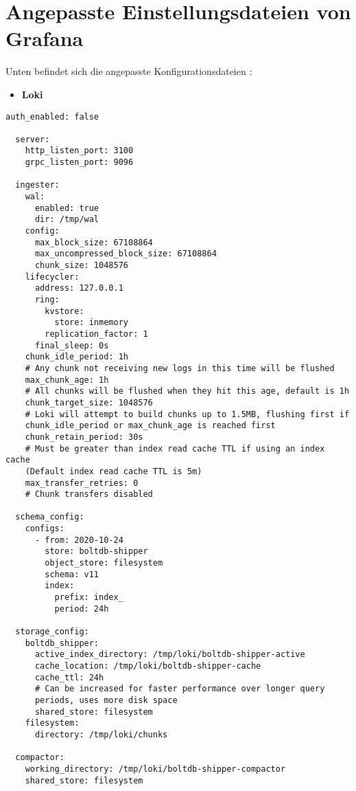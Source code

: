 \section{Angepasste Einstellungsdateien von Grafana}\label{appendix:AngepasstGrafana}

Unten befindet sich die angepasste Konfigurationsdateien \citep{Polinowski_PGL}:

\begin{itemize}[noitemsep]
    \item \textbf{Loki}
\end{itemize}

{
\begin{Verbatim}[frame=single]
  auth_enabled: false

  server:
    http_listen_port: 3100
    grpc_listen_port: 9096
  
  ingester:
    wal:
      enabled: true
      dir: /tmp/wal
    config:
      max_block_size: 67108864
      max_uncompressed_block_size: 67108864
      chunk_size: 1048576
    lifecycler:
      address: 127.0.0.1
      ring:
        kvstore:
          store: inmemory
        replication_factor: 1
      final_sleep: 0s
    chunk_idle_period: 1h       
    # Any chunk not receiving new logs in this time will be flushed
    max_chunk_age: 1h           
    # All chunks will be flushed when they hit this age, default is 1h
    chunk_target_size: 1048576  
    # Loki will attempt to build chunks up to 1.5MB, flushing first if
    chunk_idle_period or max_chunk_age is reached first
    chunk_retain_period: 30s    
    # Must be greater than index read cache TTL if using an index cache
    (Default index read cache TTL is 5m)
    max_transfer_retries: 0    
    # Chunk transfers disabled
  
  schema_config:
    configs:
      - from: 2020-10-24
        store: boltdb-shipper
        object_store: filesystem
        schema: v11
        index:
          prefix: index_
          period: 24h
  
  storage_config:
    boltdb_shipper:
      active_index_directory: /tmp/loki/boltdb-shipper-active
      cache_location: /tmp/loki/boltdb-shipper-cache
      cache_ttl: 24h         
      # Can be increased for faster performance over longer query 
      periods, uses more disk space
      shared_store: filesystem
    filesystem:
      directory: /tmp/loki/chunks
  
  compactor:
    working_directory: /tmp/loki/boltdb-shipper-compactor
    shared_store: filesystem
  

\end{Verbatim}}
